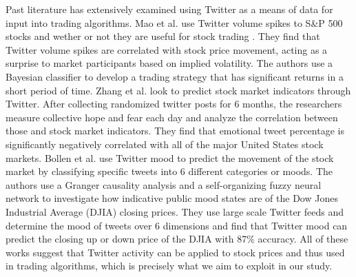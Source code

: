 \documentclass[../thesis.tex]{subfiles}
\begin{document}
Past literature has extensively examined using Twitter as a means of data for input into trading algorithms. Mao et al. \cite{Mao2013} use Twitter volume spikes to S\&P 500 stocks and wether or not they are useful for stock trading . They find that Twitter volume spikes are correlated with stock price movement, acting as a surprise to market participants based on implied volatility. The authors use a Bayesian classifier to develop a trading strategy that has significant returns in a short period of time. Zhang et al. \cite{Zhang2011} look to predict stock market indicators through Twitter. After collecting randomized twitter posts for 6 months, the researchers measure collective hope and fear each day and analyze the correlation between those and stock market indicators. They find that emotional tweet percentage is significantly negatively correlated with all of the major United States stock markets. Bollen et al. \cite{Bollen} use Twitter mood to predict the movement of the stock market by classifying specific tweets into 6 different categories or moods. The authors use a Granger causality analysis and a self-organizing fuzzy neural network to investigate how indicative public mood states are of the Dow Jones Industrial Average (DJIA) closing prices. They use large scale Twitter feeds and determine the mood of tweets over 6 dimensions and find that Twitter mood can predict the closing up or down price of the DJIA with 87\% accuracy. All of these works suggest that Twitter activity can be applied to stock prices and thus used in trading algorithms, which is precisely what we aim to exploit in our study. 
\end{document}
